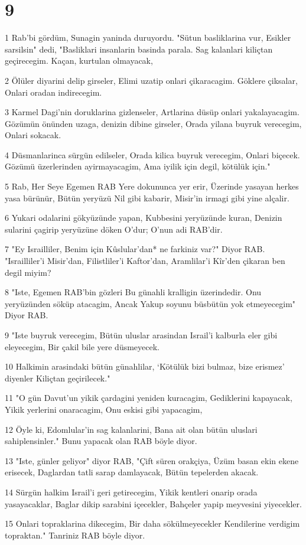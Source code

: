 \chapter{9}

\par 1 Rab'bi gördüm, Sunagin yaninda duruyordu. "Sütun basliklarina vur, Esikler sarsilsin" dedi, "Basliklari insanlarin basinda parala. Sag kalanlari kiliçtan geçirecegim. Kaçan, kurtulan olmayacak,
\par 2 Ölüler diyarini delip girseler, Elimi uzatip onlari çikaracagim. Göklere çiksalar, Onlari oradan indirecegim.
\par 3 Karmel Dagi'nin doruklarina gizlenseler, Artlarina düsüp onlari yakalayacagim. Gözümün önünden uzaga, denizin dibine girseler, Orada yilana buyruk verecegim, Onlari sokacak.
\par 4 Düsmanlarinca sürgün edilseler, Orada kilica buyruk verecegim, Onlari biçecek. Gözümü üzerlerinden ayirmayacagim, Ama iyilik için degil, kötülük için."
\par 5 Rab, Her Seye Egemen RAB Yere dokununca yer erir, Üzerinde yasayan herkes yasa bürünür, Bütün yeryüzü Nil gibi kabarir, Misir'in irmagi gibi yine alçalir.
\par 6 Yukari odalarini gökyüzünde yapan, Kubbesini yeryüzünde kuran, Denizin sularini çagirip yeryüzüne döken O'dur; O'nun adi RAB'dir.
\par 7 "Ey Israilliler, Benim için Kûslular'dan* ne farkiniz var?" Diyor RAB. "Israilliler'i Misir'dan, Filistliler'i Kaftor'dan, Aramlilar'i Kîr'den çikaran ben degil miyim?
\par 8 "Iste, Egemen RAB'bin gözleri Bu günahli kralligin üzerindedir. Onu yeryüzünden söküp atacagim, Ancak Yakup soyunu büsbütün yok etmeyecegim" Diyor RAB.
\par 9 "Iste buyruk verecegim, Bütün uluslar arasindan Israil'i kalburla eler gibi eleyecegim, Bir çakil bile yere düsmeyecek.
\par 10 Halkimin arasindaki bütün günahlilar, `Kötülük bizi bulmaz, bize erismez' diyenler Kiliçtan geçirilecek."
\par 11 "O gün Davut'un yikik çardagini yeniden kuracagim, Gediklerini kapayacak, Yikik yerlerini onaracagim, Onu eskisi gibi yapacagim,
\par 12 Öyle ki, Edomlular'in sag kalanlarini, Bana ait olan bütün uluslari sahiplensinler." Bunu yapacak olan RAB böyle diyor.
\par 13 "Iste, günler geliyor" diyor RAB, "Çift süren orakçiya, Üzüm basan ekin ekene erisecek, Daglardan tatli sarap damlayacak, Bütün tepelerden akacak.
\par 14 Sürgün halkim Israil'i geri getirecegim, Yikik kentleri onarip orada yasayacaklar, Baglar dikip sarabini içecekler, Bahçeler yapip meyvesini yiyecekler.
\par 15 Onlari topraklarina dikecegim, Bir daha sökülmeyecekler Kendilerine verdigim topraktan." Tanriniz RAB böyle diyor.



